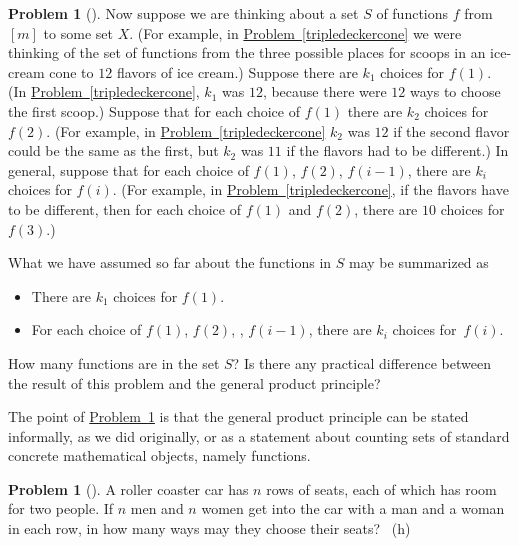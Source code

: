 \documentclass[10pt,]{book}
\theoremstyle{plain}
\theoremstyle{definition}
\newtheorem{activity}[project]{Problem}
\theoremstyle{definition}
\numberwithin{equation}{chapter}
\newcommand{\importantarrow}{\Rightarrow}
\begin{document}
\begin{activity}[] \label{generalproductprinciple}
\hypertarget{p-98}{}%
Now suppose we are thinking about a set \(S\) of functions \(f\) from \([m]\) to some set \(X\). (For example, in \hyperref[tripledeckercone]{Problem~\ref{tripledeckercone}} we were thinking of the set of functions from the three possible places for scoops in an ice-cream cone to \(12\) flavors of ice cream.) Suppose there are \(k_1\) choices for \(f(1)\). (In \hyperref[tripledeckercone]{Problem~\ref{tripledeckercone}}, \(k_1\) was \(12\), because there were \(12\) ways to choose the first scoop.) Suppose that for each choice of \(f(1)\) there are \(k_2\) choices for \(f(2)\). (For example, in \hyperref[tripledeckercone]{Problem~\ref{tripledeckercone}} \(k_2\) was \(12\) if the second flavor could be the same as the first, but \(k_2\) was \(11\) if the flavors had to be different.) In general, suppose that for each choice of \(f(1)\), \(f(2)\), \textellipsis{} \(f(i-1)\), there are \(k_i\) choices for \(f(i)\). (For example, in \hyperref[tripledeckercone]{Problem~\ref{tripledeckercone}}, if the flavors have to be different, then for each choice of \(f(1)\) and \(f(2)\), there are \(10\) choices for \(f(3)\).)%
\par
\hypertarget{p-99}{}%
What we have assumed so far about the functions in \(S\) may be summarized as \leavevmode%
\begin{itemize}[label=\textbullet]
\item{}There are \(k_1\) choices for \(f(1)\).%
\item{}For each choice of \(f(1)\), \(f(2)\), \textellipsis{}, \(f(i-1)\), there are \(k_i\) choices for~\(f(i)\).%
\end{itemize}
%
\par
\hypertarget{p-100}{}%
How many functions are in the set \(S\)? Is there any practical difference between the result of this problem and the general product principle?%
\end{activity}
\hypertarget{p-102}{}%
The point of \hyperref[generalproductprinciple]{Problem~\ref{generalproductprinciple}} is that the general product principle can be stated informally, as we did originally, or as a statement about counting sets of standard concrete mathematical objects, namely functions.%
\begin{activity}[]\marginsymbol[-1em]{\pdftooltip{$\importantarrow$}{especially interesting}} \label{activity-15}
\hypertarget{p-103}{}%
A roller coaster car has \(n\) rows of seats, each of which has room for two people. If \(n\) men and \(n\) women get into the car with a man and a woman in each row, in how many ways may they choose their seats?%
~{\tiny (h)}\end{activity}
\end{document}
